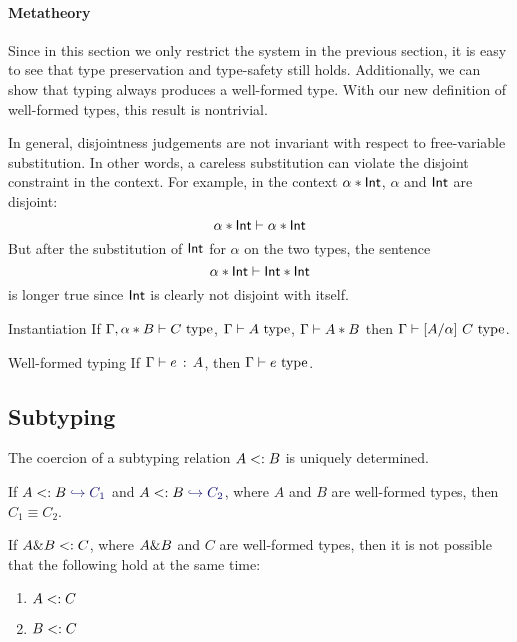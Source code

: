 \paragraph{Metatheory} Since in this section we only restrict the system in the
previous section, it is easy to see that type preservation and type-safety still
holds. Additionally, we can show that typing always produces a well-formed type.
With our new definition of well-formed types, this result is nontrivial.

In general, disjointness judgements are not invariant with respect to
free-variable substitution. In other words, a careless substitution can violate
the disjoint constraint in the context. For example, in the context $\alpha
* \textsf{Int}$, $\alpha$ and $\textsf{Int}$ are disjoint:
\[ \alpha * \textsf{Int} \vdash \alpha * \textsf{Int} \]
But after the substitution of $\textsf{Int}$ for $\alpha$ on the two types, the sentence
\[ \alpha * \textsf{Int} \vdash \textsf{Int} * \textsf{Int} \]
is longer true since $\textsf{Int}$ is clearly not disjoint with itself.

\begin{lemma}{Instantiation} \label{instantiation}
  If $\Gamma, \alpha * B \vdash C \ \text{type}$, $\Gamma \vdash A \ \text{type}$, $\Gamma \vdash A * B$ then $\Gamma \vdash \lbrack A / \alpha \rbrack~ C \ \text{type}$.
\end{lemma}

\begin{lemma}{Well-formed typing} \label{wf-typing}
If $\Gamma \vdash e \ \!:\! \ A$, then $\Gamma \vdash e \ \text{type}$.
\end{lemma}

\subsection{Subtyping}

The coercion of a subtyping relation $A <: B$ is uniquely determined.

\begin{lemma} \label{unique-coercion}
  If $A \subtype B \yields {C_1}$ and $A \subtype B \yields {C_2}$, where $A$
  and $B$ are well-formed types, then $C_1 \equiv C_2$.
\end{lemma}


\begin{lemma}
  \label{unique-subtype-contributor}
  If $A \& B <: C$, where $A \& B$ and $C$ are well-formed types,
  then it is not possible that the following hold at the same time:
\begin{enumerate}
\item $A <: C$
\item $B <: C$
\end{enumerate}
\end{lemma}

